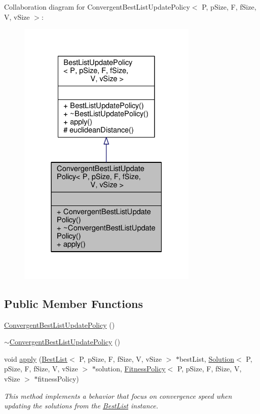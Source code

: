 Collaboration diagram for Convergent\+Best\+List\+Update\+Policy$<$ P, p\+Size, F, f\+Size, V, v\+Size $>$\+:\nopagebreak
\begin{figure}[H]
\begin{center}
\leavevmode
\includegraphics[width=243pt]{classConvergentBestListUpdatePolicy__coll__graph}
\end{center}
\end{figure}
\subsection*{Public Member Functions}
\begin{DoxyCompactItemize}
\item 
\hyperlink{classConvergentBestListUpdatePolicy_a3b4128e26d776ab760e1805beab61747}{Convergent\+Best\+List\+Update\+Policy} ()
\item 
\hyperlink{classConvergentBestListUpdatePolicy_ab965cc3715892b3a1be2559476b91791}{$\sim$\+Convergent\+Best\+List\+Update\+Policy} ()
\item 
void \hyperlink{classConvergentBestListUpdatePolicy_a6382937d32ac8bab7169f216fcd3048f}{apply} (\hyperlink{classBestList}{Best\+List}$<$ P, p\+Size, F, f\+Size, V, v\+Size $>$ $\ast$best\+List, \hyperlink{classSolution}{Solution}$<$ P, p\+Size, F, f\+Size, V, v\+Size $>$ $\ast$solution, \hyperlink{classFitnessPolicy}{Fitness\+Policy}$<$ P, p\+Size, F, f\+Size, V, v\+Size $>$ $\ast$fitness\+Policy)
\begin{DoxyCompactList}\small\item\em This method implements a behavior that focus on convergence speed when updating the solutions from the \hyperlink{classBestList}{Best\+List} instance. \end{DoxyCompactList}\end{DoxyCompactItemize}
